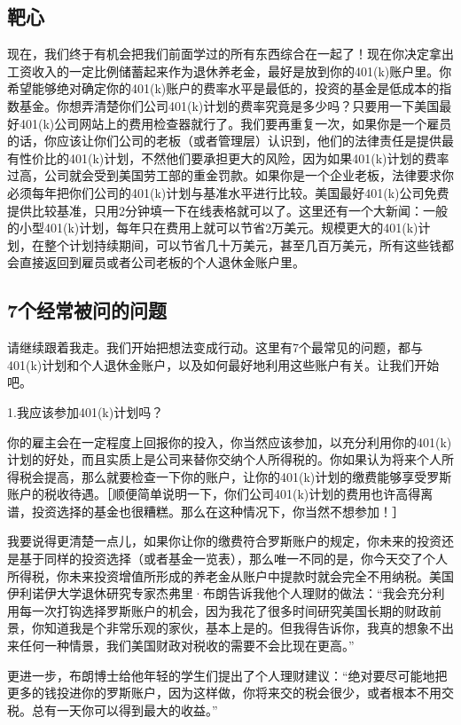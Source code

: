 \subsection{靶心}

现在，我们终于有机会把我们前面学过的所有东西综合在一起了！现在你决定拿出工资收入的一定比例储蓄起来作为退休养老金，最好是放到你的401(k)账户里。你希望能够绝对确定你的401(k)账户的费率水平是最低的，投资的基金是低成本的指数基金。你想弄清楚你们公司401(k)计划的费率究竟是多少吗？只要用一下美国最好401(k)公司网站上的费用检查器就行了。我们要再重复一次，如果你是一个雇员的话，你应该让你们公司的老板（或者管理层）认识到，他们的法律责任是提供最有性价比的401(k)计划，不然他们要承担更大的风险，因为如果401(k)计划的费率过高，公司就会受到美国劳工部的重金罚款。如果你是一个企业老板，法律要求你必须每年把你们公司的401(k)计划与基准水平进行比较。美国最好401(k)公司免费提供比较基准，只用2分钟填一下在线表格就可以了。这里还有一个大新闻：一般的小型401(k)计划，每年只在费用上就可以节省2万美元。规模更大的401(k)计划，在整个计划持续期间，可以节省几十万美元，甚至几百万美元，所有这些钱都会直接返回到雇员或者公司老板的个人退休金账户里。

\subsection{7个经常被问的问题}

请继续跟着我走。我们开始把想法变成行动。这里有7个最常见的问题，都与401(k)计划和个人退休金账户，以及如何最好地利用这些账户有关。让我们开始吧。

1.我应该参加401(k)计划吗？

你的雇主会在一定程度上回报你的投入，你当然应该参加，以充分利用你的401(k)计划的好处，而且实质上是公司来替你交纳个人所得税的。你如果认为将来个人所得税会提高，那么就要检查一下你的账户，让你的401(k)计划的缴费能够享受罗斯账户的税收待遇。［顺便简单说明一下，你们公司401(k)计划的费用也许高得离谱，投资选择的基金也很糟糕。那么在这种情况下，你当然不想参加！］

我要说得更清楚一点儿，如果你让你的缴费符合罗斯账户的规定，你未来的投资还是基于同样的投资选择（或者基金一览表），那么唯一不同的是，你今天交了个人所得税，你未来投资增值所形成的养老金从账户中提款时就会完全不用纳税。美国伊利诺伊大学退休研究专家杰弗里·布朗告诉我他个人理财的做法：“我会充分利用每一次打钩选择罗斯账户的机会，因为我花了很多时间研究美国长期的财政前景，你知道我是个非常乐观的家伙，基本上是的。但我得告诉你，我真的想象不出来任何一种情景，我们美国财政对税收的需要不会比现在更高。”

更进一步，布朗博士给他年轻的学生们提出了个人理财建议：“绝对要尽可能地把更多的钱投进你的罗斯账户，因为这样做，你将来交的税会很少，或者根本不用交税。总有一天你可以得到最大的收益。”

